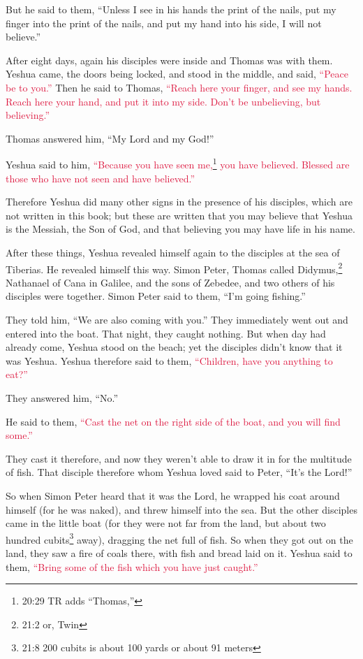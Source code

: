 But he said to them, “Unless I see in his hands the print of the nails, put my finger into
the print of the nails, and put my hand into his side, I will not believe.”

\myverse{}After eight days, again his disciples were inside and Thomas
was with them. Yeshua came, the doors being locked, and stood in the middle, and said,
\textcolor{crimson}{“Peace be to you.”}
\myverse{}Then he said to Thomas,
\textcolor{crimson}{“Reach here your finger, and see my hands. Reach here your hand, and put it into my side. Don’t be
	unbelieving, but believing.”}

\myverse{}Thomas answered him, “My Lord and my God!”

\myverse{}Yeshua said to him,
\textcolor{crimson}{“Because you have seen me,}\footnote{20:29 TR adds “Thomas,”}
\textcolor{crimson}{you have believed. Blessed are those who have not seen and have believed.”}

\myverse{}Therefore Yeshua did many other signs in the presence of his
disciples, which are not written in this book;
\myverse{}but these are written that you may believe that Yeshua is the Messiah, the
Son of God, and that believing you may have life in his name.


\mychapter{} \myverse*{}After these things, Yeshua revealed himself again to the disciples
at the sea of Tiberias. He revealed himself this way.
\myverse{}Simon Peter, Thomas called Didymus,\footnote{21:2 or, Twin} Nathanael of Cana in Galilee, and the sons of Zebedee, and two others of his
disciples were together.
\myverse{}Simon Peter said to them, “I’m going fishing.”

They told him, “We are also coming with you.” They immediately went out and entered into
the boat. That night, they caught nothing.
\myverse{}But when day had already come, Yeshua stood on the beach; yet the disciples
didn’t know that it was Yeshua.
\myverse{}Yeshua therefore said to them,
\textcolor{crimson}{“Children, have you anything to eat?”
}

They answered him, “No.”

\myverse{}He said to them,
\textcolor{crimson}{“Cast the net on the right side of the boat, and you will find some.”}

They cast it therefore, and now they weren’t able to draw it in for the multitude of fish.
\myverse{}That disciple therefore whom Yeshua loved said to Peter, “It’s the Lord!”

So when Simon Peter heard that it was the Lord, he wrapped his coat around himself (for he
was naked), and threw himself into the sea.
\myverse{}But the other disciples came in the little boat (for they were not far from
the land, but about two hundred cubits\footnote{21:8 200 cubits is about 100 yards or about 91 meters} away), dragging the net full of fish.
\myverse{}So when they got out on the land, they saw a fire of coals there, with fish
and bread laid on it.
\myverse{}Yeshua said to them,
\textcolor{crimson}{“Bring some of the fish which you have just caught.”}

